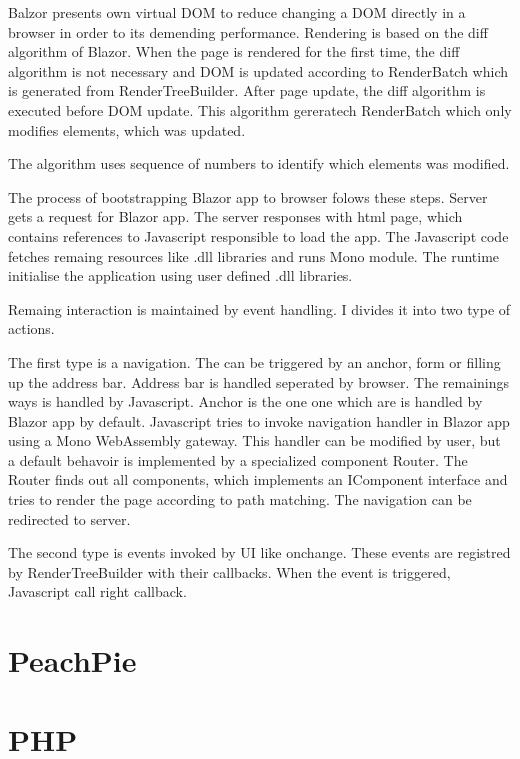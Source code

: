Balzor presents own virtual DOM to reduce changing a DOM directly in a browser in order to its demending performance.
Rendering is based on the diff algorithm of Blazor.
When the page is rendered for the first time, the diff algorithm is not necessary and DOM is updated according to RenderBatch which is generated from RenderTreeBuilder.
After page update, the diff algorithm is executed before DOM update. This algorithm gereratech RenderBatch which only modifies elements, which was updated.

The algorithm uses sequence of numbers to identify which elements was modified.




The process of bootstrapping Blazor app to browser folows these steps. 
Server gets a request for Blazor app. 
The server responses with html page, which contains references to Javascript responsible to load the app. The Javascript code fetches remaing resources like .dll libraries and runs Mono module. 
The runtime initialise the application using user defined .dll libraries.

Remaing interaction is maintained by event handling.
I divides it into two type of actions.

The first type is a navigation.
The \cite{navigation} can be triggered by an anchor, form or filling up the address bar.
Address bar is handled seperated by browser.
The remainings ways is handled by Javascript.
Anchor is the one one which are is handled by Blazor app by default.
Javascript tries to invoke navigation handler in Blazor app using a Mono WebAssembly gateway.
This handler can be modified by user, but a default behavoir is implemented by a specialized component Router.
The Router finds out all components, which implements an IComponent interface and tries to render the page according to path matching.
The navigation can be redirected to server.

The second type is events invoked by UI like onchange. These events are registred by RenderTreeBuilder with their callbacks. When the event is triggered, Javascript call right callback.

\section{PeachPie}


\section{PHP}

